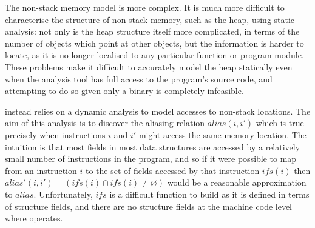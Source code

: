 {The non-stack memory model is more complex.  It is much more difficult
to characterise the structure of non-stack memory, such as the heap,
using static analysis: not only is the heap structure itself more
complicated, in terms of the number of objects which point at other
objects, but the information is harder to locate, as it is no longer
localised to any particular function or program module.  These
problems make it difficult to accurately model the heap statically
even when the analysis tool has full access to the program's source
code\needCite{}, and attempting to do so given only a binary is
completely infeasible.

{\Technique} instead relies on a dynamic analysis to model accesses to
non-stack locations.  The aim of this analysis is to discover the
aliasing relation $\mathit{alias}(i, i')$ which is true precisely when
instructions $i$ and $i'$ might access the same memory location.  The
intuition is that most fields in most data structures are accessed by
a relatively small number of instructions in the program, and so if it
were possible to map from an instruction $i$ to the set of fields
accessed by that instruction $\mathit{ifs}(i)$ then
$\mathit{alias}'(i,i') = (\mathit{ifs}(i) \cap \mathit{ifs}(i) \not=
\varnothing)$ would be a reasonable approximation to $\mathit{alias}$.
Unfortunately, $\mathit{ifs}$ is a difficult function to build as it
is defined in terms of structure fields, and there are no structure
fields at the machine code level where {\technique} operates.

}
